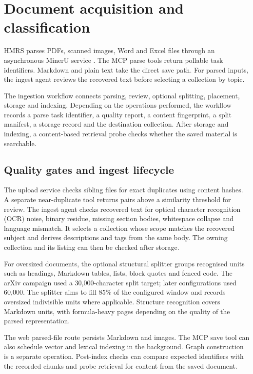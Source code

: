 \section{Document acquisition and classification}
\label{sec:acquisition}

HMRS parses PDFs, scanned images, Word and Excel files through
an asynchronous MinerU service \citep{mineru}. The MCP parse tools return
pollable task identifiers. Markdown and plain text take the direct save
path. For parsed inputs, the ingest agent reviews the recovered text
before selecting a collection by topic.

The ingestion workflow connects parsing, review, optional splitting,
placement, storage and indexing. Depending on the operations performed,
the workflow records a parse task identifier, a quality report, a
content fingerprint, a split manifest, a storage record and the
destination collection. After storage and indexing, a content-based retrieval probe
checks whether the saved material is searchable.

\subsection{Quality gates and ingest lifecycle}

The upload service checks sibling files for exact duplicates using content
hashes. A separate near-duplicate tool returns pairs above a similarity
threshold for review. The ingest agent checks recovered text for
optical character recognition (OCR) noise,
binary residue, missing section bodies, whitespace collapse and language
mismatch. It selects a collection whose scope matches the recovered subject and
derives descriptions and tags from the same body. The owning collection and
its listing can then be checked after storage.

For oversized documents, the optional structural splitter groups recognised
units such as headings, Markdown tables, lists, block quotes and fenced code.
The arXiv campaign used a 30,000-character split target; later configurations used
60,000. The splitter aims to fill 85\% of the configured window and records
oversized indivisible units where applicable. Structure recognition covers
Markdown units, with formula-heavy pages depending on the quality of the
parsed representation.

The web parsed-file route persists Markdown and images. The MCP save tool
can also schedule vector and lexical indexing in the background. Graph
construction is a separate operation. Post-index checks can compare
expected identifiers with the recorded chunks and probe retrieval for
content from the saved document.
